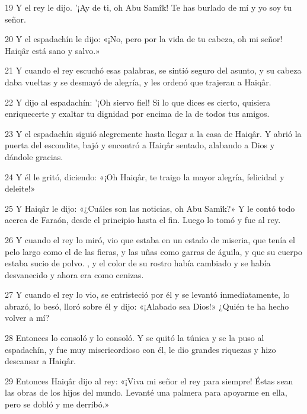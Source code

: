 \par 19 Y el rey le dijo. '¡Ay de ti, oh Abu Samîk! Te has burlado de mí y yo soy tu señor.

\par 20 Y el espadachín le dijo: «¡No, pero por la vida de tu cabeza, oh mi señor! Haiqâr está sano y salvo.»

\par 21 Y cuando el rey escuchó esas palabras, se sintió seguro del asunto, y su cabeza daba vueltas y se desmayó de alegría, y les ordenó que trajeran a Haiqâr.

\par 22 Y dijo al espadachín: '¡Oh siervo fiel! Si lo que dices es cierto, quisiera enriquecerte y exaltar tu dignidad por encima de la de todos tus amigos.

\par 23 Y el espadachín siguió alegremente hasta llegar a la casa de Haiqâr. Y abrió la puerta del escondite, bajó y encontró a Haiqâr sentado, alabando a Dios y dándole gracias.

\par 24 Y él le gritó, diciendo: «¡Oh Haiqâr, te traigo la mayor alegría, felicidad y deleite!»

\par 25 Y Haiqâr le dijo: «¿Cuáles son las noticias, oh Abu Samîk?» Y le contó todo acerca de Faraón, desde el principio hasta el fin. Luego lo tomó y fue al rey.

\par 26 Y cuando el rey lo miró, vio que estaba en un estado de miseria, que tenía el pelo largo como el de las fieras, y las uñas como garras de águila, y que su cuerpo estaba sucio de polvo. , y el color de su rostro había cambiado y se había desvanecido y ahora era como cenizas.

\par 27 Y cuando el rey lo vio, se entristeció por él y se levantó inmediatamente, lo abrazó, lo besó, lloró sobre él y dijo: «¡Alabado sea Dios!» ¿Quién te ha hecho volver a mí?

\par 28 Entonces lo consoló y lo consoló. Y se quitó la túnica y se la puso al espadachín, y fue muy misericordioso con él, le dio grandes riquezas y hizo descansar a Haiqâr.

\par 29 Entonces Haiqâr dijo al rey: «¡Viva mi señor el rey para siempre! Éstas sean las obras de los hijos del mundo. Levanté una palmera para apoyarme en ella, pero se dobló y me derribó.»

